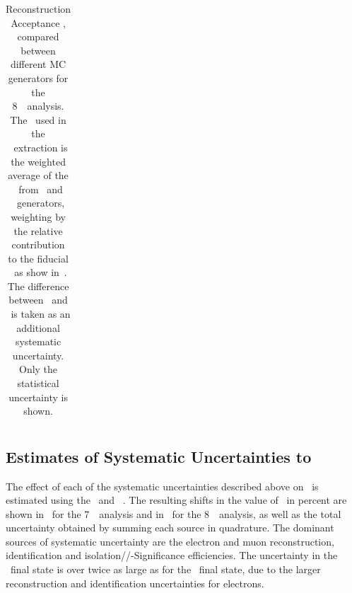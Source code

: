 \begin{table}[htbp]
\begin{tabular}{l c c c c}


    \end{tabular}
    \caption[Reconstruction Acceptance \CZZ, compared between different MC
    generators for the 8~\tev\ analysis.]{Reconstruction Acceptance \CZZ, compared between different MC
    generators for the 8~\tev\ analysis. The \CZZ\ used in the \cx\ extraction is the
    weighted average of the \CZZ\ from \powhegbox\ and \ggtwoZZ\ generators, weighting
    by the relative contribution to the fiducial \cx\ as show in~.
    The difference between \powhegbox\ and \sherpa\ is taken as an additional
    systematic uncertainty.
    Only the statistical uncertainty is shown. 
    }
    \label{table:objSel-syst-genComp-eight}
\end{table}

\subsection{Estimates of Systematic Uncertainties to \CZZ}
\label{sec:systematic-estimate-tables}

The effect of each of the systematic uncertainties described above on \CZZ\ is estimated using
the \powhegbox\ and \ggZZ\ \mc. The resulting shifts in the value of \CZZ\ in
percent are shown in~ for the 7~\tev\ analysis and
in~ for the 8~\tev\ analysis, as well as the total
uncertainty obtained by summing each source in quadrature. The
dominant sources of systematic uncertainty are the electron and muon reconstruction,
identification and isolation/\zzero/\dzero-Significance efficiencies. The
uncertainty in the \eeee\ final state is over twice as large as for the \mmmm\
final state, due to the larger reconstruction and identification uncertainties
for electrons.

